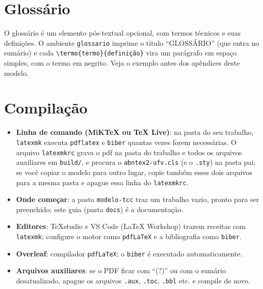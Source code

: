 \section{Glossário}

O glossário é um elemento pós-textual opcional, com termos técnicos e suas definições. O
ambiente \texttt{glossario} imprime o título ``GLOSSÁRIO'' (que entra no sumário) e cada
\texttt{\textbackslash termo\{termo\}\{definição\}} vira um parágrafo em espaço simples,
com o termo em negrito. Veja o exemplo antes dos apêndices deste modelo.

\section{Compilação}

\begin{itemize}
  \item \textbf{Linha de comando (MiKTeX ou TeX Live)}: na pasta do seu trabalho,
        \texttt{latexmk} executa \texttt{pdflatex} e \texttt{biber} quantas vezes forem
        necessárias. O arquivo \texttt{latexmkrc} grava o \ac{pdf} na pasta do trabalho e
        todos os arquivos auxiliares em \texttt{build/}, e procura o
        \texttt{abntex2-ufv.cls} (e o \texttt{.sty}) na pasta pai; se você copiar o modelo para outro
        lugar, copie também esses dois arquivos para a mesma pasta e apague essa linha do \texttt{latexmkrc}.
  \item \textbf{Onde começar}: a pasta \texttt{modelo-tcc} traz um trabalho vazio, pronto
        para ser preenchido; este guia (pasta \texttt{docs}) é a documentação.
  \item \textbf{Editores}: TeXstudio e VS Code (LaTeX Workshop) trazem receitas com
        \texttt{latexmk}; configure o motor como \texttt{pdfLaTeX} e a bibliografia como \texttt{biber}.
  \item \textbf{Overleaf}: compilador \texttt{pdfLaTeX}; o \texttt{biber} é executado
        automaticamente.
  \item \textbf{Arquivos auxiliares}: se o PDF ficar com ``(?)'' ou com o sumário
        desatualizado, apague os arquivos \texttt{.aux}, \texttt{.toc}, \texttt{.bbl}
        etc. e compile de novo.
\end{itemize}
